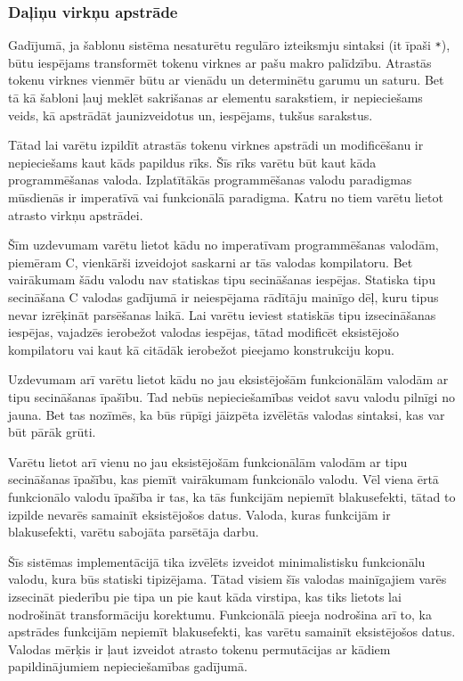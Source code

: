 \subsubsection{\label{sbsbs:sys_language}Daļiņu virkņu apstrāde}

Gadījumā, ja šablonu sistēma nesaturētu regulāro izteiksmju sintaksi (it īpaši \verb|*|), būtu iespējams transformēt tokenu virknes ar pašu makro palīdzību. Atrastās tokenu virknes vienmēr būtu ar vienādu un determinētu garumu un saturu. Bet tā kā šabloni ļauj meklēt sakrišanas ar elementu sarakstiem, ir nepieciešams veids, kā apstrādāt jaunizveidotus un, iespējams, tukšus sarakstus.

Tātad lai varētu izpildīt atrastās tokenu virknes apstrādi un modificēšanu ir nepieciešams kaut kāds papildus rīks. Šīs rīks varētu būt kaut kāda programmēšanas valoda. Izplatītākās programmēšanas valodu paradigmas mūsdienās ir imperatīvā  vai funkcionālā paradigma. Katru no tiem varētu lietot atrasto virkņu apstrādei.

Šīm uzdevumam varētu lietot kādu no imperatīvam programmēšanas valodām, piemēram C, vienkārši izveidojot saskarni ar tās valodas kompilatoru. Bet vairākumam šādu valodu nav statiskas tipu secināšanas iespējas. Statiska tipu secināšana C valodas gadījumā ir neiespējama rādītāju mainīgo dēļ, kuru tipus nevar izrēķināt parsēšanas laikā. Lai varētu ieviest statiskās tipu izsecināšanas iespējas, vajadzēs ierobežot valodas iespējas, tātad modificēt eksistējošo kompilatoru vai kaut kā citādāk ierobežot pieejamo konstrukciju kopu.

Uzdevumam arī varētu lietot kādu no jau eksistējošām funkcionālām valodām ar tipu secināšanas īpašību. Tad nebūs nepieciešamības veidot savu valodu pilnīgi no jauna. Bet tas nozīmēs, ka būs rūpīgi jāizpēta izvēlētās valodas sintaksi, kas var būt pārāk grūti.

Varētu lietot arī vienu no jau eksistējošām funkcionālām valodām ar tipu secināšanas īpašību, kas piemīt vairākumam funkcionālo valodu. Vēl viena ērtā funkcionālo valodu īpašība ir tas, ka tās funkcijām nepiemīt blakusefekti, tātad to izpilde nevarēs samainīt eksistējošos datus. Valoda, kuras funkcijām ir blakusefekti, varētu sabojāta parsētāja darbu.

Šīs sistēmas implementācijā tika izvēlēts izveidot minimalistisku funkcionālu valodu, kura būs statiski tipizējama. Tātad visiem šīs valodas mainīgajiem varēs izsecināt piederību pie tipa un pie kaut kāda virstipa, kas tiks lietots lai nodrošināt transformāciju korektumu. Funkcionālā pieeja nodrošina arī to, ka apstrādes funkcijām nepiemīt blakusefekti, kas varētu samainīt eksistējošos datus. Valodas mērķis ir ļaut izveidot atrasto tokenu permutācijas ar kādiem papildinājumiem nepieciešamības gadījumā.


